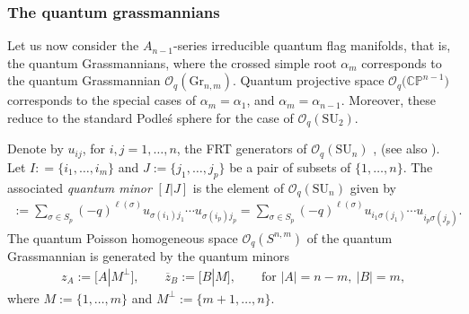 \documentclass[pdftex]{sigma}
\numberwithin{equation}{section}
\begin{document}
\subsubsection{The quantum grassmannians}

Let us now consider the $A_{n-1}$-series irreducible quantum flag manifolds, that is, the quantum Grassmannians, where the crossed simple root $\alpha_m$ corresponds to the quantum Grassmannian $\mathcal{O}_q(\mathrm{Gr}_{n,m})$. Quantum projective space $\mathcal{O}_q\big(\mathbb{CP}^{n-1}\big)$ corresponds to the special cases of $\alpha_m = \alpha_1$, and $\alpha_m = \alpha_{n-1}$. Moreover, these reduce to the standard Podle\'s sphere for the case of $\mathcal{O}_q(\mathrm{SU}_2)$.

Denote by $u_{ij}$, for $i,j = 1, \dots, n$, the FRT generators of $\mathcal{O}_q(\mathrm{SU}_n)$ \cite{FRT89}, (see also \cite[Section~9.2]{KSLeabh}). Let $I: = \{i_1, \dots, i_m\}$ and $J:=\{j_1, \dots, j_p\}$ be a pair of subsets of $\{1,\dots, n\}$. The associated {\em quantum minor} $[I|J]$ is the element of $\mathcal{O}_q(\mathrm{SU}_n)$ given by
\begin{gather*}
[I|J] := \sum_{\sigma \in S_p} (-q)^{\ell(\sigma)}u_{\sigma(i_1)j_1} \cdots u_{\sigma(i_p)j_p} = \sum_{\sigma \in S_p} (-q)^{\ell(\sigma)} u_{i_1\sigma(j_1)} \cdots u_{i_p\sigma(j_p)}.
\end{gather*}
The quantum Poisson homogeneous space $\mathcal{O}_q(S^{n,m})$ of the quantum Grassmannian is generated by the quantum minors
\begin{gather*}
z_{A} := \big[A|M^{\perp}\big], \qquad \overline{z}_B := [B|M], \qquad \textrm{for } |A| = n-m, \ |B| = m,
\end{gather*}
where $M := \{1, \dots, m\}$ and $M^\perp:= \{m+1, \dots, n\}$.
\end{document}
